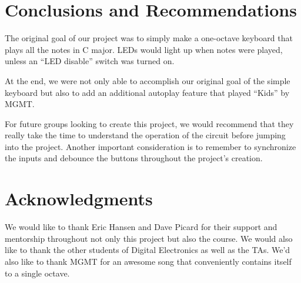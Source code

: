 \documentclass{article}
\begin{document}
\section{Conclusions and Recommendations}


  The original goal of our project was to simply make a one-octave keyboard that plays all the notes in C major. LEDs would light up when notes were played, unless an ``LED disable'' switch was turned on.

  At the end, we were not only able to accomplish our original goal of the simple keyboard but also to add an additional autoplay feature that played ``Kids'' by MGMT.

  For future groups looking to create this project, we would recommend that they really take the time to understand the operation of the circuit before jumping into the project. Another important consideration is to remember to synchronize the inputs and debounce the buttons throughout the project's creation.

\newpage
\section{Acknowledgments}

  

  We would like to thank Eric Hansen and Dave Picard for their support and mentorship throughout not only this project but also the course. We would also like to thank the other students of Digital Electronics as well as the TAs. We'd also like to thank MGMT for an awesome song that conveniently contains itself to a single octave.
\end{document}
